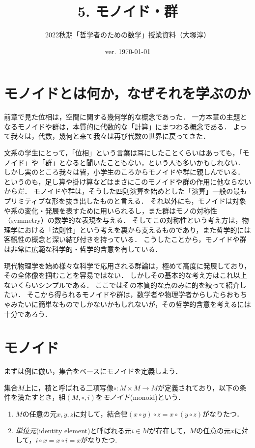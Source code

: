 \documentclass[11pt,a4paper,uplatex]{jsarticle}
\begin{document}
\title{5. モノイド・群}
\author{2022秋期「哲学者のための数学」授業資料（大塚淳）}
\date{ver. \today}
\maketitle

\section{モノイドとは何か，なぜそれを学ぶのか}
前章で見た位相は，空間に関する幾何学的な概念であった．
一方本章の主題となるモノイドや群は，本質的に代数的な「計算」にまつわる概念である．
よって我々は，代数，幾何と来て我々は再び代数の世界に戻ってきた．

文系の学生にとって，「位相」という言葉は耳にしたことくらいはあっても，「モノイド」や「群」となると聞いたこともない，という人も多いかもしれない．
しかし実のところ我々は皆，小学生のころからモノイドや群に親しんでいる．
というのも，足し算や掛け算などはまさにこのモノイドや群の作用に他ならないからだ．
モノイドや群は，そうした四則演算を始めとした「演算」一般の最もプリミティブな形を抜き出したものと言える．
それ以外にも，モノイドは対象や系の変化・発展を表すために用いられるし，また群はモノの対称性（symmetry）の数学的な表現を与える．
そしてこの対称性という考え方は，物理学における「法則性」という考えを裏から支えるものであり，また哲学的には客観性の概念と深い結び付きを持っている．
こうしたことから，モノイドや群は非常に広範な科学的・哲学的含意を有している．

現代物理学を始め様々な科学で応用される群論は，極めて高度に発展しており，その全体像を掴むことを容易ではない．
しかしその基本的な考え方はこれ以上ないくらいシンプルである．
ここではその本質的な点のみに的を絞って紹介したい．
そこから得られるモノイドや群は，数学者や物理学者からしたらおもちゃみたいに簡単なものでしかないかもしれないが，その哲学的含意を考えるには十分であろう．

\section{モノイド}
まずは例に倣い，集合をベースにモノイドを定義しよう．

\begin{dfn}[モノイド]
集合$M$上に，積と呼ばれる二項写像$\circ: M \times M \to M$が定義されており，以下の条件を満たすとき，組$(M, \circ, i)$を\emph{モノイド}(monoid)という．
\begin{enumerate}
 \item $M$の任意の元$x, y, z$に対して，結合律$(x \circ y) \circ z = x \circ (y \circ z)$がなりたつ．
 \item \emph{単位元}(identity element)と呼ばれる元$i \in M$が存在して，$M$の任意の元$x$に対して，$i \circ x = x \circ i = x$がなりたつ.
\end{enumerate} 
\end{dfn}
\end{document}
